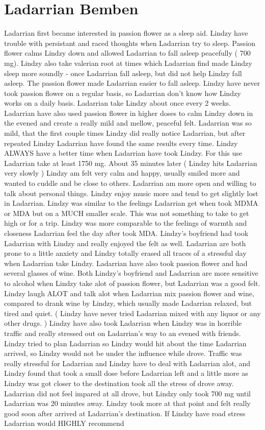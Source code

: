 \documentclass[12pt]{book}
\begin{document}
\chapter{Ladarrian Bemben}

Ladarrian first became interested in passion flower as a sleep aid. Lindzy have trouble with persistant and raced thoughts when Ladarrian try to sleep. Passion flower calms Lindzy down and allowed Ladarrian to fall asleep peacefully ( 700 mg). Lindzy also take valerian root at times which Ladarrian find made Lindzy sleep more soundly - once Ladarrian fall asleep, but did not help Lindzy fall asleep. The passion flower made Ladarrian easier to fall asleep. Lindzy have never took passion flower on a regular basis, so Ladarrian don't know how Lindzy works on a daily basis. Ladarrian take Lindzy about once every 2 weeks. Ladarrian have also used passion flower in higher doses to calm Lindzy down in the evened and create a really mild and mellow, peaceful felt. Ladarrian was so mild, that the first couple times Lindzy did really notice Ladarrian, but after repeated Lindzy Ladarrian have found the same results every time. Lindzy ALWAYS have a better time when Ladarrian have took Lindzy. For this use Ladarrian take at least 1750 mg. About 35 minutes later ( Lindzy hits Ladarrian very slowly ) Lindzy am felt very calm and happy, usually smiled more and wanted to cuddle and be close to others. Ladarrian am more open and willing to talk about personal things. Lindzy enjoy music more and tend to get slightly lost in Ladarrian. Lindzy was similar to the feelings Ladarrian get when took MDMA or MDA but on a MUCH smaller scale. This was not something to take to get high or for a trip. Lindzy was more comparable to the feelings of warmth and closeness Ladarrian feel the day after took MDA. Lindzy's boyfriend had took Ladarrian with Lindzy and really enjoyed the felt as well. Ladarrian are both prone to a little anxiety and Lindzy totally erased all traces of a stressful day when Ladarrian take Lindzy. Ladarrian have also took passion flower and had several glasses of wine. Both Lindzy's boyfriend and Ladarrian are more sensitive to alcohol when Lindzy take alot of passion flower, but Ladarrian was a good felt. Lindzy laugh ALOT and talk alot when Ladarrian mix passion flower and wine, compared to drank wine by Lindzy, which usually made Ladarrian relaxed, but tired and quiet. ( Lindzy have never tried Ladarrian mixed with any liquor or any other drugs. ) Lindzy have also took Ladarrian when Lindzy was in horrible traffic and really stressed out on Ladarrian's way to an evened with friends. Lindzy tried to plan Ladarrian so Lindzy would hit about the time Ladarrian arrived, so Lindzy would not be under the influence while drove. Traffic was really stressful for Ladarrian and Lindzy have to deal with Ladarrian alot, and Lindzy found that took a small dose before Ladarrian left and a little more as Lindzy was got closer to the destination took all the stress of drove away. Ladarrian did not feel impared at all drove, but Lindzy only took 700 mg until Ladarrian was 20 minutes away. Lindzy took more at that point and felt really good soon after arrived at Ladarrian's destination. If Lindzy have road stress Ladarrian would HIGHLY recommend 
\end{document}
